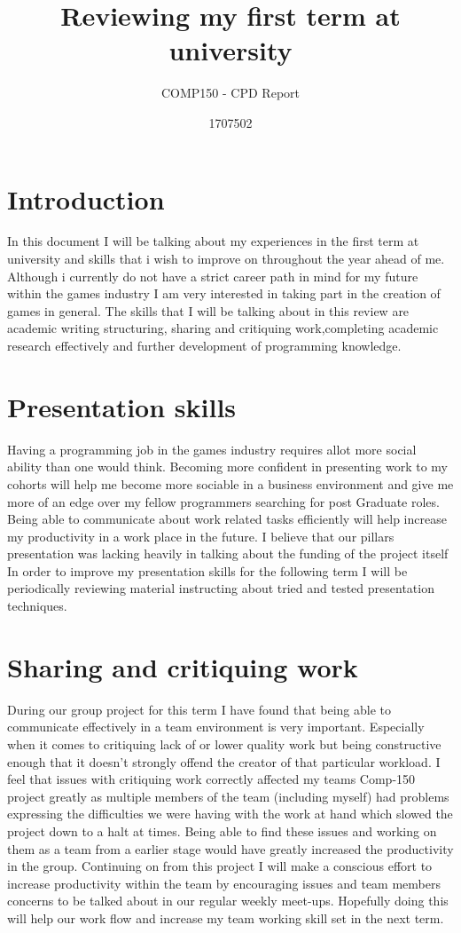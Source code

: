 \documentclass{scrartcl}
\title{Reviewing my first term at university}
\subtitle{COMP150 - CPD Report}
\author{1707502}
\begin{document}
\maketitle

\section{Introduction}
In this document I will be talking about my experiences in the first term at university and skills that i wish to improve on throughout the year ahead of me.
Although i currently do not have a strict career path in mind for my future within the games industry I am very interested in taking part in the creation of games in general. The skills that I will be talking about in this review are academic writing structuring, sharing and critiquing work,completing academic research effectively and further development of programming knowledge.   

\section{Presentation skills}
Having a programming job in the games industry requires allot more social ability than one would think. Becoming more confident in presenting work to my cohorts will help me become more sociable in a business environment and give me more of  an edge over my fellow programmers searching for post Graduate roles. Being able to communicate about work related tasks efficiently will help increase my productivity in a work place in the future.
I believe that our pillars presentation was lacking heavily in talking about the funding of the project itself  In order to improve my presentation skills for the following term I will be periodically reviewing material instructing about tried and tested presentation techniques. 


\section{Sharing and critiquing work}

During our group project for this term I have found that being able to communicate effectively in a team environment is very important. Especially when it comes to critiquing lack of or lower quality work but being constructive enough that it doesn't strongly offend the creator of that particular workload. I feel that issues with critiquing work correctly affected my teams Comp-150 project greatly as multiple members of the team (including myself) had problems expressing the difficulties we were having with the work at hand which slowed the project down to a halt at times. Being able to find these issues and working on them as a team from a earlier stage would have greatly increased the productivity in the group. Continuing on from this project I will make a conscious effort to increase productivity within the team by encouraging issues and team members concerns to be talked about in our regular weekly meet-ups. Hopefully doing this will help our work flow and increase my team working skill set in the next term. 
\end{document}
